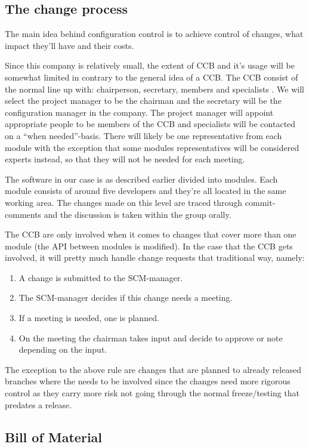 \documentclass[a4paper,11pt]{article}
\begin{document}
\subsection{The change process}
The main idea behind configuration control is to achieve control of changes,
what impact they'll have and their costs.

Since this company is relatively small, the extent of CCB and it's usage will be
somewhat limited in contrary to the general idea of a CCB. The CCB consist of
the normal line up with: chairperson, secretary, members and specialists
\cite{daniels}. We will select the project manager to be the chairman and the
secretary will be the configuration manager in the company. The project manager
will appoint appropriate people to be members of the CCB and specialists will be
contacted on a ``when needed''-basis. There will likely be one representative
from each module with the exception that some modules representatives will be
considered experts instead, so that they will not be needed for each meeting.

The software in our case is as described earlier divided into modules. Each
module consists of around five developers and they're all located in the same
working area. The changes made on this level are traced through commit-comments
and the discussion is taken within the group orally.

The CCB are only involved when it comes to changes that cover more than one
module (the API between modules is modified). In the case that the CCB gets
involved, it will pretty much handle change requests that traditional way,
namely:

\begin{enumerate}
 \item A change is submitted to the SCM-manager.
 \item The SCM-manager decides if this change needs a meeting.
 \item If a meeting is needed, one is planned.
 \item On the meeting the chairman takes input and decide to approve or note
depending on the input.
\end{enumerate}

The exception to the above rule are changes that are planned to already
released branches where the needs to be involved since the changes need more
rigorous control as they carry more risk not going through the normal
freeze/testing that predates a release.


\subsection{Bill of Material}
\end{document}
